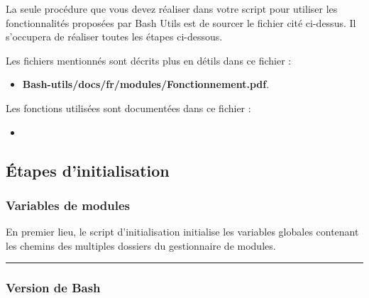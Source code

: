 \documentclass[a4paper,10pt]{article}
\begin{document}
\begin{justify}
    La seule procédure que vous devez réaliser dans votre script pour utiliser les fonctionnalités proposées par Bash Utils est de sourcer le fichier cité ci-dessus. Il s'occupera de réaliser toutes les étapes ci-dessous.
\end{justify}

\begin{justify}
    Les fichiers mentionnés sont décrits plus en détils dans ce fichier :

    \begin{itemize}
        \item \textbf{\color{lime}Bash-utils/docs/fr/modules/Fonctionnement.pdf}.
    \end{itemize}
\end{justify}

\begin{justify}
    Les fonctions utilisées sont documentées dans ce fichier :

    \begin{itemize}
        \item \textbf{\color{lime}}
    \end{itemize}

\end{justify}



\color{green}
\subsection{Étapes d'initialisation}\color{white}

\color{blue}
\subsubsection{Variables de modules}\color{white}

\begin{justify}
    En premier lieu, le script d'initialisation initialise les variables globales contenant les chemins des multiples dossiers du gestionnaire de modules.
\end{justify}



\color{blue}\par\noindent\rule{\textwidth}{0.4pt}\color{white}

\color{blue}
\subsubsection{Version de Bash}\color{white}
\end{document}
